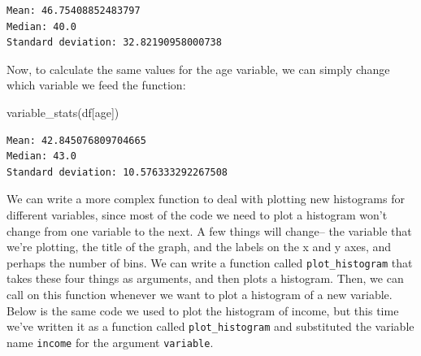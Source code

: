 \documentclass[
  letterpaper,
  DIV=11,
  numbers=noendperiod]{scrreprt}
\newenvironment{Shaded}{\begin{snugshade}}{\end{snugshade}}
\newcommand{\NormalTok}[1]{\textcolor[rgb]{0.00,0.23,0.31}{#1}}
\newcommand{\StringTok}[1]{\textcolor[rgb]{0.13,0.47,0.30}{#1}}
\begin{document}
\begin{verbatim}
Mean: 46.75408852483797
Median: 40.0
Standard deviation: 32.82190958000738
\end{verbatim}

Now, to calculate the same values for the age variable, we can simply
change which variable we feed the function:

\begin{Shaded}
\begin{Highlighting}[]
\NormalTok{variable\_stats(df[}\StringTok{\textquotesingle{}age\textquotesingle{}}\NormalTok{]) }
\end{Highlighting}
\end{Shaded}

\begin{verbatim}
Mean: 42.845076809704665
Median: 43.0
Standard deviation: 10.576333292267508
\end{verbatim}

We can write a more complex function to deal with plotting new
histograms for different variables, since most of the code we need to
plot a histogram won't change from one variable to the next. A few
things will change-- the variable that we're plotting, the title of the
graph, and the labels on the x and y axes, and perhaps the number of
bins. We can write a function called \texttt{plot\_histogram} that takes
these four things as arguments, and then plots a histogram. Then, we can
call on this function whenever we want to plot a histogram of a new
variable. Below is the same code we used to plot the histogram of
income, but this time we've written it as a function called
\texttt{plot\_histogram} and substituted the variable name
\texttt{income} for the argument \texttt{variable}.
\end{document}

